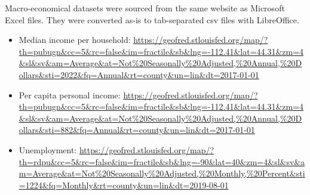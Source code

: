 \documentclass[11pt,]{report}
\begin{document}
Macro-economical datasets were sourced from the same website as Microsoft Excel files. They were converted as-is to tab-separated csv files with LibreOffice.

\begin{itemize}
\item
  Median income per household:
  \url{https://geofred.stlouisfed.org/map/?th=pubugn\&cc=5\&rc=false\&im=fractile\&sb\&lng=-112.41\&lat=44.31\&zm=4\&sl\&sv\&am=Average\&at=Not\%20Seasonally\%20Adjusted,\%20Annual,\%20Dollars\&sti=2022\&fq=Annual\&rt=county\&un=lin\&dt=2017-01-01}
\item
  Per capita personal income:
  \url{https://geofred.stlouisfed.org/map/?th=pubugn\&cc=5\&rc=false\&im=fractile\&sb\&lng=-112.41\&lat=44.31\&zm=4\&sl\&sv\&am=Average\&at=Not\%20Seasonally\%20Adjusted,\%20Annual,\%20Dollars\&sti=882\&fq=Annual\&rt=county\&un=lin\&dt=2017-01-01}
\item
  Unemployment:
  \url{https://geofred.stlouisfed.org/map/?th=rdpu\&cc=5\&rc=false\&im=fractile\&sb\&lng=-90\&lat=40\&zm=4\&sl\&sv\&am=Average\&at=Not\%20Seasonally\%20Adjusted,\%20Monthly,\%20Percent\&sti=1224\&fq=Monthly\&rt=county\&un=lin\&dt=2019-08-01}
\end{itemize}
\end{document}
